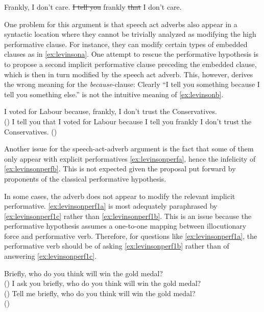 \ea
	\ea \label{ex:franklya} Frankly, I don’t care.
	\ex \label{ex:franklyb} \sout{I tell you} frankly \sout{that} I don’t care.
	\z
\z

One problem for this argument is that speech act adverbs also appear in a syntactic location
where they cannot be trivially analyzed as modifying the high performative clause.
For instance, they can  modify certain types of embedded clauses as in \eqref{ex:levinsona}.
One attempt to rescue the performative hypothesis is to propose a second implicit
 performative clause preceding the embedded clause, which is then in turn modified
by the speech act adverb. This, however, derives the wrong meaning for the \emph{because}-clause: Clearly ``I tell you something because I tell you something else.'' is not the
intuitive meaning of \eqref{ex:levinsonb}.

\ea
\ea\label{ex:levinsona}  I voted for Labour because, frankly, I don’t trust the Conservatives.\\
		(\citealt[262: ex 85]{Levinson1983})
\ex \label{ex:levinsonb}  I tell you that I voted for Labour because I tell you frankly I don’t trust
the Conservatives. (\citealt[262: ex 86]{Levinson1983})
\z
\z


Another issue for the speech-act-adverb argument is the fact that some of them only appear with explicit performatives \eqref{ex:levinsonperfa}, hence the infelicity of  \eqref{ex:levinsonperfb}. This is not expected given
the proposal put forward by proponents of the classical performative hypothesis.

\ea
{}
	\z
\z

In some cases, the adverb does not appear to modify the relevant implicit performative. \eqref{ex:levinsonperf1a} is most adequately paraphrased by \eqref{ex:levinsonperf1c} rather than \eqref{ex:levinsonperf1b}. This is
an issue because the performative hypothesis assumes a one-to-one mapping between
illocutionary force and performative verb. Therefore, for questions like  \eqref{ex:levinsonperf1a}, the
performative verb should be of asking \eqref{ex:levinsonperf1b} rather than of answering \eqref{ex:levinsonperf1c}.
 
\ea
\ea \label{ex:levinsonperf1a} Briefly, who do you think will win the gold medal? \\
(\citealt[256: ex 60]{Levinson1983})
\ex \label{ex:levinsonperf1b} I ask you briefly, who do you think will win the gold medal?
 \\
(\citealt[256: ex 61]{Levinson1983})
\ex \label{ex:levinsonperf1c} Tell me briefly, who do you think will win the gold medal?
 \\
(\citealt[256: ex 62]{Levinson1983})
	\z
	\z

